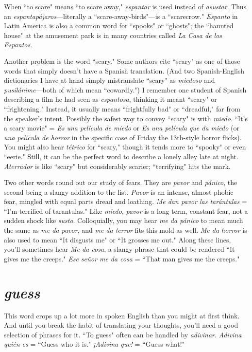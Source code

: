 When ``to scare" means ``to scare away," \emph{espantar} is used instead of \emph{asustar}. Thus an \emph{espantapájaros}---literally a ``scare-away-birds"---is a ``scarecrow." \emph{Espanto} in Latin America is also a common
word for ``spooks" or ``ghosts"; the ``haunted house" at the amusement
park is in many countries called \emph{La Casa de los Espantos}.

Another problem is the word ``scary." Some authors cite ``scary"
as one of those words that simply doesn't have a Spanish translation.
(And two Spanish-English dictionaries I have at hand simply mistranslate ``scary" as \emph{miedoso} and \emph{pusilánime}---both of which mean ``cowardly.") I remember one student of Spanish describing a film he had
seen as \emph{espantosa}, thinking it meant ``scary" or ``frightening." Instead,
it usually means ``frightfully bad" or ``dreadful," far from the speaker's
intent. Possibly the safest way to convey ``scary" is with \emph{miedo}. ``It's a
scary movie" = \emph{Es una película de miedo} or \emph{Es una película que da
miedo} (or \emph{una película de horror} in the specific case of Friday the 13th-style horror flicks). You might also hear \emph{tétrico} for ``scary," though
it tends more to ``spooky" or even ``eerie." Still, it can be the perfect
word to describe a lonely alley late at night. \emph{Aterrador} is like ``scary"
but considerably scarier; ``terrifying" hits the mark.

Two other words round out our study of fears. They are \emph{pavor}
and \emph{pánico}, the second being a slangy addition to the list. \emph{Pavor} is an
intense, almost phobic fear, mingled with equal parts dread and loathing. \emph{Me dan pavor las tarántulas} = ``I'm terrified of tarantulas." Like
\emph{miedo}, \emph{pavor} is a long-term, constant fear, not a sudden shock like
\emph{susto}. Colloquially, you may hear \emph{me da pánico} to mean much the
same as \emph{me da pavor}, and \emph{me da terror} fits this mold as well. \emph{Me da
horror} is also used to mean ``It disgusts me" or ``It grosses me out."
Along these lines, you'll sometimes hear \emph{Me da cosa}, a slangy phrase
that could be rendered ``It gives me the creeps." \emph{Ese señor me da cosa}
= ``That man gives me the creeps."

\section{\emph{guess}}

This word crops up a lot more in spoken English than you
might at first think. And until you break the habit of translating your
thoughts, you'll need a good selection of phrases for it. ``To guess" often can be handled by \emph{adivinar}. \emph{Adivina quién es} = ``Guess who it
is." \emph{¡Adivina que!} = ``Guess what!"

